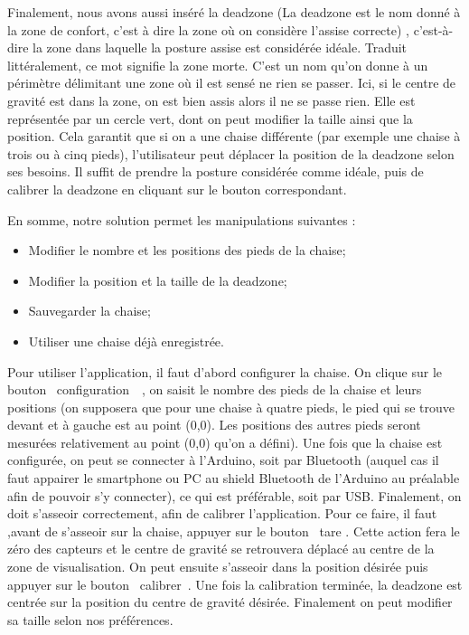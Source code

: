 \documentclass{polytech/polytech}
\begin{document}
Finalement, nous avons aussi inséré la \guillemotleft  deadzone (La deadzone est le nom donné à la zone de confort, c'est à dire la zone où on considère l'assise correcte) \guillemotright, c'est-à-dire la zone dans laquelle la posture assise est considérée idéale. Traduit littéralement, ce mot signifie la zone morte. C'est un nom qu'on donne à un périmètre délimitant une zone où il est sensé ne rien se passer. Ici, si le centre de gravité est dans la zone, on est bien assis alors il ne se passe rien. Elle est représentée par un cercle vert, dont on peut modifier la taille ainsi que la position. Cela garantit que si on a une chaise différente (par exemple une chaise à trois ou à cinq pieds), l'utilisateur peut déplacer la position de la deadzone selon ses besoins. Il suffit de prendre la posture considérée comme idéale, puis de calibrer la deadzone en cliquant sur le bouton correspondant.

En somme, notre solution permet les manipulations suivantes :
\begin{itemize}
\item Modifier le nombre et les positions des pieds de la chaise;
\item Modifier la position et la taille de la deadzone;
\item Sauvegarder la chaise;
\item Utiliser une chaise déjà enregistrée.
\end{itemize}


Pour utiliser l'application, il faut d'abord configurer la chaise. On clique sur le bouton \guillemotleft ~configuration~\guillemotright\ , on saisit le nombre des pieds de la chaise et leurs positions (on supposera que pour une chaise à quatre pieds, le pied qui se trouve devant et à gauche est au point (0,0). Les positions des autres pieds seront mesurées relativement au point (0,0) qu'on a défini).
 Une fois que la chaise est configurée, on peut se connecter à l'Arduino, soit par Bluetooth (auquel cas il faut appairer le smartphone ou PC au shield Bluetooth de l'Arduino au préalable afin de pouvoir s'y connecter), ce qui est préférable, soit par USB. 
Finalement, on doit s'asseoir correctement, afin de calibrer l'application.
Pour ce faire, il faut ,avant de s'asseoir sur la chaise, appuyer sur le bouton \guillemotleft ~tare \guillemotright . Cette action fera le zéro des capteurs et le centre de gravité se retrouvera déplacé au centre de la zone de visualisation. On peut ensuite s'asseoir dans la position désirée puis appuyer sur le bouton \guillemotleft\ calibrer~\guillemotright . Une fois la calibration terminée, la deadzone est centrée sur la position du centre de gravité désirée. Finalement on peut modifier sa taille selon nos préférences. 
\end{document}
